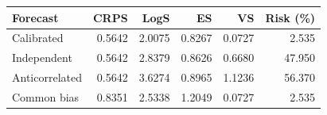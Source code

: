 \begin{tabular}{lrrrrr}
\toprule
Forecast & CRPS & LogS & ES & VS & Risk (\%) \\
\midrule
Calibrated & 0.5642 & 2.0075 & 0.8267 & 0.0727 & 2.535 \\
Independent & 0.5642 & 2.8379 & 0.8626 & 0.6680 & 47.950 \\
Anticorrelated & 0.5642 & 3.6274 & 0.8965 & 1.1236 & 56.370 \\
Common bias & 0.8351 & 2.5338 & 1.2049 & 0.0727 & 2.535 \\
\bottomrule
\end{tabular}
